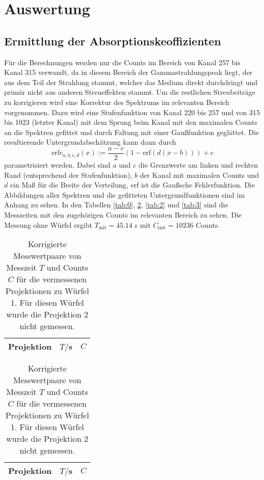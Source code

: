 

\section{Auswertung}
\subsection{Ermittlung der Absorptionskeoffizienten}
Für die Berechnungen werden nur die Counts im Bereich von Kanal 257 bis Kanal 315 verwandt, da in
diesem Bereich der Gammastrahlungspeak liegt, der aus dem Teil der Strahlung stammt, welcher
das Medium direkt durchdringt und primär nicht aus anderen Streueffekten stammt. Um die
restlichen
Streubeiträge zu korrigieren wird eine Korrektur des Spektrums im relevanten Bereich vorgenommen.
Dazu wird eine Stufenfunktion von Kanal 220 bis 257 und von 315 bis 1023 (letzter Kanal) mit dem
Sprung beim Kanal mit den maximalen Counts an die Spektren gefittet und durch Faltung mit einer
Gaußfunktion geglättet. Die resultierende Untergrundabschätzung kann dann durch
\begin{equation}
\text{erfc}_{a,b,c,d}(x):=\frac{a-c}{2} \left(1-\text{erf}(d(x-b))\right)+c
\end{equation}
parametrisiert werden. Dabei sind $a$ und $c$ die Grenzwerte am linken und rechten Rand
(entsprechend der Stufenfunktion), $b$ der Kanal mit maximalen Counts und $d$ ein Maß für die
Breite der Verteilung, $\text{erf}$ ist die Gaußsche Fehlerfunktion. Die Abbildungen aller
Spektren und die gefitteten Untergrundfunktionen sind im Anhang zu sehen. In den Tabellen
\ref{tab:0}, \ref{tab:1}, \ref{tab:2} und \ref{tab:3} sind die Messzeiten mit den zugehörigen
Counts im relevanten Bereich zu sehen. Die Messung ohne Würfel ergibt $T_\text{init}=45.14$ s mit
$C_\text{init}=10236$ Counts.
\begin{table}
\centering
\begin{tabular}{ccc}
\toprule \midrule
Projektion &$T/$s & $C$ \\
\midrule

\midrule
\bottomrule
\end{tabular}
\caption{Korrigierte Messwertpaare von Messzeit $T$ und Counts $C$ für die vermessenen
Projektionen zu
Würfel 0.} \label{tab:0}

\begin{tabular}{ccc}
\toprule \midrule
Projektion &$T/$s & $C$ \\
\midrule

\midrule
\bottomrule
\end{tabular}
\caption{Korrigierte Messwertpaare von Messzeit $T$ und Counts $C$ für die vermessenen
Projektionen zu
Würfel 1. Für diesen Würfel wurde die Projektion 2 nicht gemessen.} \label{tab:1}
\end{table}

